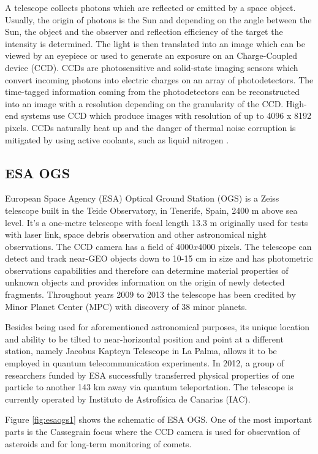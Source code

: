 	A telescope collects photons which are reflected or emitted by a space object. Usually, the origin of photons is the Sun and depending on the angle between the Sun, the object and the observer and reflection efficiency of the target the intensity is determined. The light is then translated into an image which can be viewed by an eyepiece or used to generate an exposure on an Charge-Coupled device (CCD). CCDs are photosensitive and solid-state imaging sensors which convert incoming photons into electric charges on an array of photodetectors. The time-tagged information coming from the photodetectors can be reconstructed into an image with a resolution depending on the granularity of the CCD. High-end systems use CCD which produce images with resolution of up to 4096 x 8192 pixels. CCDs naturally heat up and the danger of thermal noise corruption is mitigated by using active coolants, such as liquid nitrogen \citep{klinkrad2006space}.

\subsection{ESA OGS}\label{subsec:esa_ogs}
European Space Agency (ESA) Optical Ground Station (OGS) is a Zeiss telescope built in the Teide Observatory, in Tenerife, Spain, 2400 m above sea level. It’s a one-metre telescope with focal length 13.3 m originally used for tests with laser link, space debris observation and other astronomical night observations. The CCD camera has a field of $4000 x 4000$ pixels. The telescope can detect and track near-GEO objects down to 10-15 cm in size and has photometric observations capabilities and therefore can determine material properties of unknown objects and provides information on the origin of newly detected fragments. Throughout years 2009 to 2013 the telescope has been credited by Minor Planet Center (MPC) with discovery of 38 minor planets.
 
	Besides being used for aforementioned astronomical purposes, its unique location and ability to be tilted to near-horizontal position and point at a different station, namely Jacobus Kapteyn Telescope in La Palma, allows it to be employed in quantum telecommunication experiments. In 2012, a group of researchers funded by ESA successfully transferred physical properties of one particle to another 143 km away via quantum teleportation. The telescope is currently operated by Instituto de Astrofísica de Canarias (IAC).

	Figure \ref{fig:esaogs1} shows the schematic of ESA OGS. One of the most important parts is the Cassegrain focus where the CCD camera is used for observation of asteroids and for long-term monitoring of comets.


